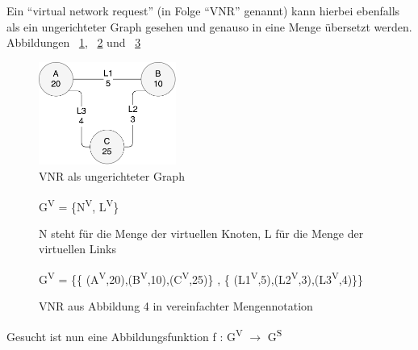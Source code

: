 \documentclass{lni}
\begin{document}
Ein "`virtual network request"' (in Folge "`VNR"' genannt) kann hierbei ebenfalls als ein ungerichteter Graph gesehen und genauso in eine Menge übersetzt werden. Abbildungen ~\ref{graph4}, ~\ref{graph5} und ~\ref{graph6}
\vspace{1cm}
\begin{figure}[htb]
\begin{center}
\includegraphics[width=0.4\textwidth]{VNR1.pdf}\newline
\caption{\label{graph4}VNR als ungerichteter Graph}
\end{center}
\end{figure}

\vspace{1cm}
\begin{figure}[htb]
\begin{center}
G\textsuperscript{V} = \{N\textsuperscript{V}, L\textsuperscript{V}\}\newline
\caption{\label{graph5}N steht für die Menge der virtuellen Knoten, L für die Menge der virtuellen Links}
\end{center}
\end{figure}

\vspace{1cm}
\begin{figure}[htb]
\begin{center}
G\textsuperscript{V} = \{\{
(A\textsuperscript{V},20),(B\textsuperscript{V},10),(C\textsuperscript{V},25)\} , \{
(L1\textsuperscript{V},5),(L2\textsuperscript{V},3),(L3\textsuperscript{V},4)\}\}
\caption{\label{graph6}VNR aus Abbildung 4 in vereinfachter Mengennotation}
\end{center}
\end{figure}


Gesucht ist nun eine Abbildungsfunktion f : G\textsuperscript{V} $\rightarrow$ G\textsuperscript{S}
\end{document}
